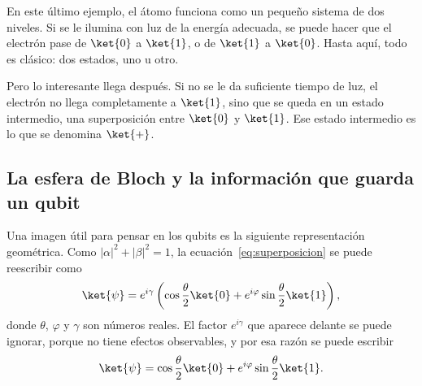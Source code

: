 En este último ejemplo, el átomo funciona como un pequeño sistema de dos niveles. Si se le
ilumina con luz de la energía adecuada, se puede hacer que el electrón pase de $\ket{0}$ a
$\ket{1}$, o de $\ket{1}$ a $\ket{0}$. Hasta aquí, todo es clásico: dos estados, uno u otro.

Pero lo interesante llega después. Si no se le da suficiente tiempo de luz, el electrón no
llega completamente a $\ket{1}$, sino que se queda en un estado intermedio, una superposición
entre $\ket{0}$ y $\ket{1}$. Ese estado intermedio es lo que se denomina $\ket{+}$.


\subsection{La esfera de Bloch y la información que guarda un qubit}
\label{sec:bloch}
Una imagen útil para pensar en los qubits es la siguiente representación geométrica. Como
$|\alpha|^2 + |\beta|^2 = 1$, la ecuación~\eqref{eq:superposicion} se puede reescribir como
\begin{equation}
\label{eq:bloch_gamma}
\ket{\psi} = e^{i\gamma}\left( \cos\frac{\theta}{2}\ket{0}
             + e^{i\varphi} \sin\frac{\theta}{2}\ket{1} \right),
\end{equation}
donde $\theta$, $\varphi$ y $\gamma$ son números reales. El factor $e^{i\gamma}$ que aparece
delante se puede ignorar, porque no tiene efectos observables, y por esa razón se puede
escribir
\begin{equation}
\label{eq:bloch}
\ket{\psi} = \cos\frac{\theta}{2}\ket{0} + e^{i\varphi} \sin\frac{\theta}{2}\ket{1}.
\end{equation}

